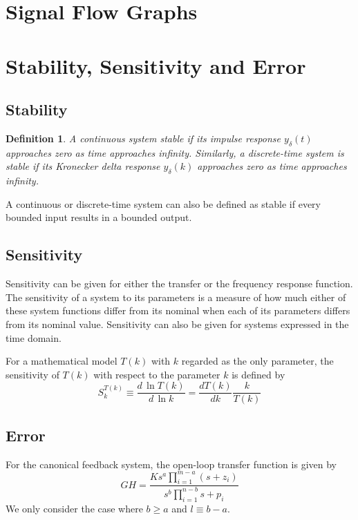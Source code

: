 \documentclass[11pt]{book}
\theoremstyle{example}
\newtheorem{definition}{Definition}[section]
\begin{document}
\section{Signal Flow Graphs}

\section{Stability, Sensitivity and Error}

\subsection{Stability}

\begin{definition} A continuous system \emph{stable} if its impulse response $y_\delta(t)$ approaches zero as time approaches infinity. Similarly, a discrete-time system is stable if its Kronecker delta response $y_\delta(k)$ approaches zero as time approaches infinity.\end{definition}

A continuous or discrete-time system can also be defined as stable if every bounded input results in a bounded output.

\subsection{Sensitivity}

Sensitivity can be given for either the transfer or the frequency response function. The sensitivity of a system to its parameters is a measure of how much either of these system functions differ from its nominal when each of its parameters differs from its nominal value. Sensitivity can also be given for systems expressed in the time domain.

For a mathematical model $T(k)$ with $k$ regarded as the only parameter, the sensitivity of $T(k)$ with respect to the parameter $k$ is defined by
\begin{equation}
	S_k^{T(k)}\equiv\frac{d\,\ln{T(k)}}{d\,\ln{k}}=\frac{dT(k)}{dk}\frac{k}{T(k)}
\end{equation}

\subsection{Error}

For the canonical feedback system, the open-loop transfer function is given by
\begin{equation}
	GH=\frac{Ks^a\prod_{i=1}^{m-a}{(s+z_i)}}{s^b\prod_{i=1}^{n-b}{s+p_i}}
\end{equation}
We only consider the case where $b\geq{a}$ and $l\equiv{b-a}$.
\end{document}
